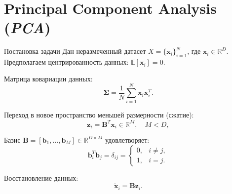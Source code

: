 \section{Principal Component Analysis (\textit{PCA})}

\begin{frame}[allowframebreaks]{Постановка задачи}
    Дан неразмеченный датасет $X = \{\boldsymbol{x}_i\}_{i=1}^N$, где $\boldsymbol{x}_i \in \mathbb{R}^D$.
    Предполагаем центрированность данных: $\mathbb{E}[\boldsymbol{x}_i] = 0$.

    Матрица ковариации данных:
    \begin{equation*}
        \boldsymbol{\Sigma} = \frac{1}{N}\sum_{i=1}^N\boldsymbol{x}_i\boldsymbol{x}_i^T.
    \end{equation*}

    Переход в новое пространство меньшей размерности (сжатие):
    \begin{equation*}
        \boldsymbol{z}_i = \mathbf{B}^T\boldsymbol{x}_i \in \mathbb{R}^M, \quad M<D,
    \end{equation*}

    \framebreak

    Базис $\mathbf{B} = [\boldsymbol{b}_1, \ldots, \boldsymbol{b}_M] \in \mathbb{R}^{D \times M}$ удовлетворяет:
    \begin{equation*}
        \boldsymbol{b}_i^T \boldsymbol{b}_j = \delta_{ij} = \begin{cases}
            0, & i\neq j, \\
            1, & i=j.
        \end{cases}
    \end{equation*}

    Восстановление данных:
    \begin{equation*}
        \tilde{\boldsymbol{x}}_i = \mathbf{B}\boldsymbol{z}_i.
    \end{equation*}
\end{frame}

